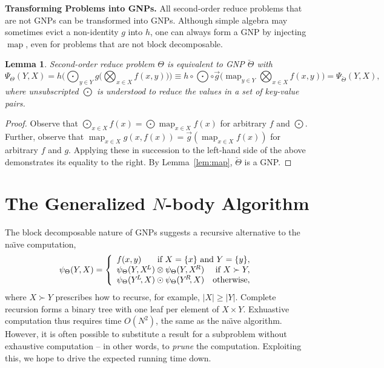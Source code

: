 \documentclass{article}
\newtheorem{lemma}{Lemma}
\newtheorem{example} {Example}
\newcommand{\killspace}{\vspace{-0.08in}}
\newcommand{\GNP}[1][\psi]{{#1}_{\Theta}}
\DeclareMathOperator*{\map}{map}
\newcommand{\comp}{\mathbin{\circ}}
\newcommand{\kdleft}[1]{#1^{\!L}}
\newcommand{\kdright}[1]{#1^{\!R}}
\begin{document}
{\bf Transforming Problems into GNPs.}  All second-order reduce
problems that are not GNPs can be transformed into GNPs.
Although simple algebra may sometimes evict a non-identity $g$ into $h$, one can always form a GNP by injecting $\map$, even for problems that are not block decomposable.
\begin{lemma}
  Second-order reduce problem $\Theta$ is equivalent to GNP
  $\breve{\Theta}$ with
  \[
  \Psi_{\Theta}(Y,X) = h \Big( \bigodot_{y \in Y} g \Big( \bigotimes_{x \in X} f(x,y) \Big) \Big) \equiv h \comp {\textstyle \bigodot} \comp \overrightarrow{g} \Big( \map_{y \in Y} \bigotimes_{x \in X} f(x,y) \Big) = \Psi_{\breve{\Theta}}(Y,X),
  \]
  where unsubscripted $\bigodot$ is understood to reduce the values in
  a set of key-value pairs.
\end{lemma}
\killspace
\begin{proof}
  Observe that $\bigodot_{x \in X} f(x) = \bigodot{} \map_{x \in X}
  f(x)$ for arbitrary $f$ and $\bigodot$.  Further, observe that
  $\map_{x \in X} g(x,f(x)) = \overrightarrow{g} \left( \map_{x \in X}
  f(x) \right)$ for arbitrary $f$ and $g$.  Applying these in
  succession to the left-hand side of the above demonstrates its
  equality to the right.  By Lemma~\ref{lem:map}, $\breve{\Theta}$ is
  a GNP.
\end{proof}
% 

\section{The Generalized $N$-body Algorithm}

The block decomposable nature of GNPs suggests a recursive alternative
to the na\"{\i}ve computation,
\[
\GNP(Y,X) = \left\{ \begin{array}{lrr}
  f(x,y) & \multicolumn{2}{r}{\mbox{\rm if } X = \{x\} \mbox{ \rm and } Y = \{y\},} \\
  \multicolumn{2}{l}{\GNP(Y,\kdleft{X}) \otimes \GNP(Y,\kdright{X})} & \mbox{\rm if } X \succ Y, \\
  \multicolumn{2}{l}{\GNP(\kdleft{Y}\!,X) \odot \GNP(\kdright{Y}\!,X)} & \mbox{\rm otherwise},
\end{array} \right.
\]
where $X \succ Y$ prescribes how to recurse,
for example, $|X| \geq |Y|$.
Complete recursion forms a binary tree with one leaf per
element of $X \times Y$.  Exhuastive computation thus requires time
$O(N^2)$, the same as the na\"{\i}ve algorithm.
However, it is often possible to substitute a result for a subproblem without exhaustive computation -- in other words, to {\it prune} the computation.
Exploiting this, we hope to drive the expected running time down.
\end{document}
